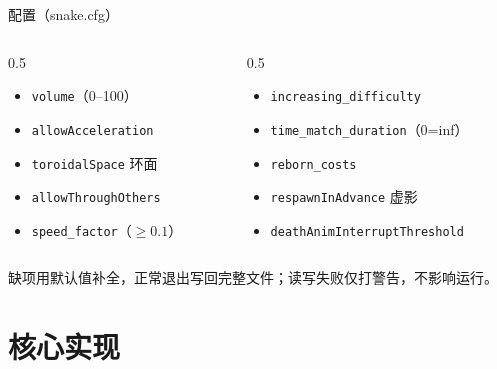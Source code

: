 \documentclass[aspectratio=169,13pt]{beamer}
\begin{document}
\begin{frame}{配置（snake.cfg）}
  \footnotesize
  \begin{columns}[T]
    \begin{column}{0.5\textwidth}
      \begin{itemize}
        \item \texttt{volume}（0--100）
        \item \texttt{allowAcceleration}
        \item \texttt{toroidalSpace} 环面
        \item \texttt{allowThroughOthers}
        \item \texttt{speed\_factor}（$\ge 0.1$）
      \end{itemize}
    \end{column}
    \begin{column}{0.5\textwidth}
      \begin{itemize}
        \item \texttt{increasing\_difficulty}
        \item \texttt{time\_match\_duration}（0=inf）
        \item \texttt{reborn\_costs}
        \item \texttt{respawnInAdvance} 虚影
        \item \texttt{deathAnimInterruptThreshold}
      \end{itemize}
    \end{column}
  \end{columns}

  \vspace{0.5em}
  缺项用默认值补全，正常退出写回完整文件；读写失败仅打警告，不影响运行。
\end{frame}

\section{核心实现}
\end{document}
